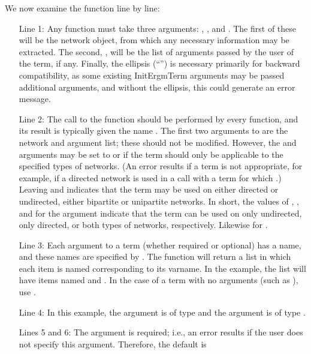 \documentclass[nojss]{jss}
\begin{document}
We now examine the  function line by line:
\begin{itemize}
\item[Line 1:]
Any  function must take three arguments:
, , and .  The first of these will be the network object, from
which any necessary information may be extracted.  The second, ,
will be the list of arguments passed by the user of the term, if any.  Finally, the ellipsis (``'')
is necessary primarily for backward compatibility, as some existing InitErgmTerm arguments may
be passed additional arguments, and without the ellipsis, this could generate an error message.
\item[Line 2:]
The call to the  function should be performed by every
 function, and its result is typically given the name .
The first two arguments to  are the network and argument list; these
should not be modified.  However, the  and  arguments may
be set to  or  if the term should only be applicable to the specified
types of networks.  (An error results if a term is not appropriate, for example, if a directed network
is used in a call with a term for which .)  Leaving 
and  indicates that the term may be used on either directed or
undirected, either bipartite or unipartite networks. In short, the values of , , and  for the
argument  indicate that the term can be used on only undirected, only directed, or both types
of networks, respectively.  Likewise for .
\item[Line 3:]  Each argument to a term  (whether required or optional) has a name, and these names are
specified by .  The 
function will return a list in which each item is named corresponding to its varname.
In the example, the list will have items named  and .
In the case of a term with no arguments (such as ), use
.
\item[Line 4:] In this example, the argument  is of type
 and the argument  is of type .
\item[Lines 5 and 6:] The  argument is required; i.e., an error results
if the user does not specify this argument.  Therefore, the default  is

\end{itemize}
\end{document}
